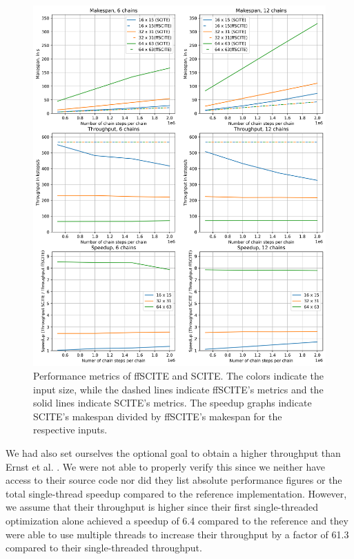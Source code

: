 \begin{figure}
    \includegraphics[width=\textwidth]{figures/performance.png}
    \caption{Performance metrics of \ac{ffSCITE} and \ac{SCITE}. The colors indicate the input size, while the dashed lines indicate \ac{ffSCITE}'s metrics and the solid lines indicate \ac{SCITE}'s metrics. The speedup graphs indicate \ac{SCITE}'s makespan divided by \ac{ffSCITE}'s makespan for the respective inputs.}
    \label{fig:performance}
\end{figure}

We had also set ourselves the optional goal to obtain a higher throughput than Ernst et al. \cite{ernst2020Performance}. We were not able to properly verify this since we neither have access to their source code nor did they list absolute performance figures or the total single-thread speedup compared to the reference implementation. However, we assume that their throughput is higher since their first single-threaded optimization alone achieved a speedup of 6.4 compared to the reference and they were able to use multiple threads to increase their throughput by a factor of 61.3 compared to their single-threaded throughput.
